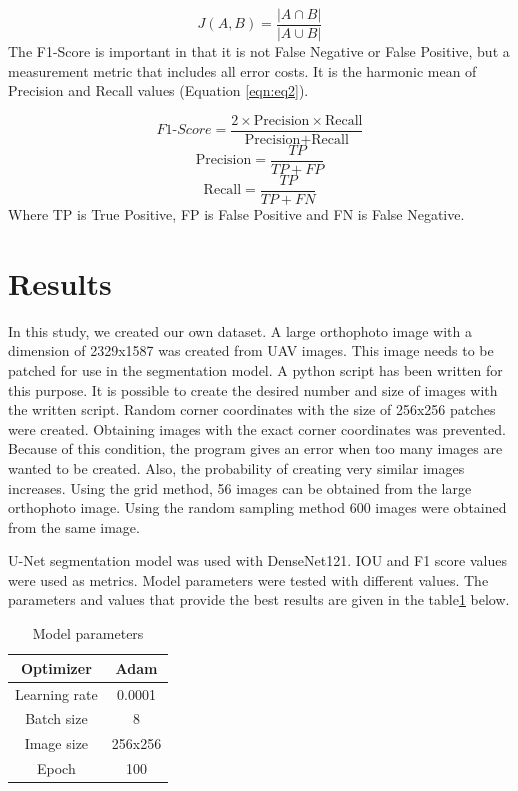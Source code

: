 \documentclass[a4paper,fleqn]{cas-sc}
\begin{document}
\begin{equation}
\label{eqn:eq1}
    J(A,B) = \frac{|A \cap B|}{|A \cup B|}
\end{equation}
The F1-Score is important in that it is not False Negative or False Positive, but a measurement metric that includes all error costs. It is the harmonic mean of Precision and Recall values (Equation \ref{eqn:eq2}).

\begin{equation}
\label{eqn:eq2}
F1\text{-}Score = \frac{2 \times \text{Precision} \times \text{Recall}}{\text{Precision} + \text{Recall}}
\end{equation}
\[
\text{Precision} = \frac{TP}{TP + FP}
\]
\[
\text{Recall} = \frac{TP}{TP + FN}
\]
Where TP is True Positive, FP is False Positive and FN is False Negative.


\section{Results}
In this study, we created our own dataset. A large orthophoto image with a dimension of 2329x1587 was created from UAV images. This image needs to be patched for use in the segmentation model. A python script has been written for this purpose. It is possible to create the desired number and size of images with the written script. Random corner coordinates with the size of 256x256 patches were created. Obtaining images with the exact corner coordinates was prevented. Because of this condition, the program gives an error when too many images are wanted to be created. Also, the probability of creating very similar images increases. Using the grid method, 56 images can be obtained from the large orthophoto image. Using the random sampling method 600 images were obtained from the same image.

U-Net segmentation model was used with DenseNet121. IOU and F1 score values were used as metrics. Model parameters were tested with different values. The parameters and values that provide the best results are given in the table\ref{tab:Table1} below.


\begin{table}
	\centering
	\caption{Model parameters}
	\label{tab:Table1}
	\begin{tabular}{ |c|c|} 
		\hline
		Optimizer&Adam\\ 
		\hline 
		Learning rate&0.0001\\
		\hline
		Batch size&8\\
		\hline
		Image size&256x256\\
		\hline
		Epoch&100\\
		\hline
	\end{tabular} 
\end{table}
\end{document}
